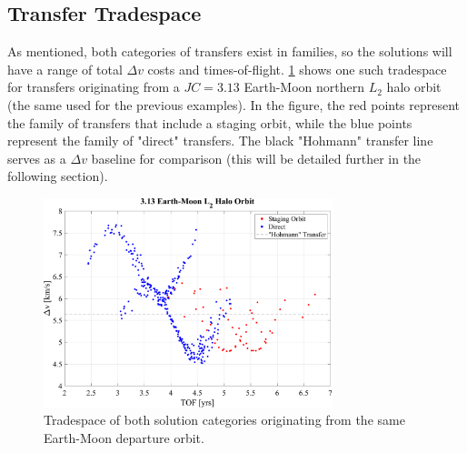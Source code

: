 \subsection{Transfer Tradespace}
As mentioned, both categories of transfers exist in families, so the solutions will have a range of
total $\Delta v$ costs and times-of-flight. \cref{fig:tradespace} shows one such tradespace for
transfers originating from a $JC=3.13$ Earth-Moon northern $L_{2}$ halo orbit (the same used for
the previous examples). In the figure, the red points represent the family of transfers that
include a staging orbit, while the blue points represent the family of "direct" transfers. The
black "Hohmann" transfer line serves as a $\Delta v$ baseline for comparison (this will be detailed
further in the following section).

\begin{figure}[ht]
    \centering
    \includegraphics[width=0.75\textwidth]{figures/Tradespace.pdf}
    \caption{Tradespace of both solution categories originating from the same Earth-Moon departure orbit.}
    \label{fig:tradespace}
\end{figure}
